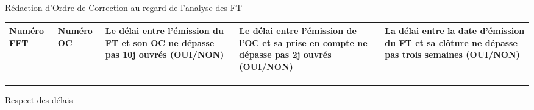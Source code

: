 \begin{center}
	Rédaction d'Ordre de Correction au regard de l'analyse des FT
\end{center}



\begin{table}[H]
\centering
	\begin{tabularx}{16.8cm}{|X|X|X|X|X|}
	\hline
	
	 \cellcolor{gray!40} Numéro FFT &
	 \cellcolor{gray!40} Numéro OC &
	 \cellcolor{gray!40} Le délai entre l'émission du FT et son OC ne dépasse pas 10j ouvrés (OUI/NON) &
	 \cellcolor{gray!40} Le délai entre l'émission de l'OC et sa prise en compte ne dépasse pas 2j ouvrés (OUI/NON) &
	 \cellcolor{gray!40} La délai entre la date d'émission du FT et sa clôture ne dépasse pas trois semaines (OUI/NON)  \\
	
	\hline
	 & & & & \\
	\hline
	 & & & & \\
	\hline
	 & & & & \\
	\hline
	
	
	\end{tabularx}
\end{table}

\begin{center}
	Respect des délais
\end{center}
